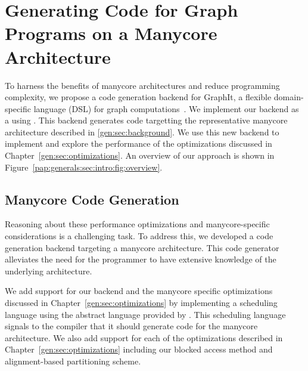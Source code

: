 \chapter{Generating Code for Graph Programs on a Manycore Architecture}\label{gen:sec:graphitbackend}
%

\introOverviewFigure

To harness the benefits of manycore architectures and reduce programming complexity, we propose a code generation backend for GraphIt, a flexible domain-specific language (DSL) for graph computations~\cite{zhang2018graphit}. 
We implement our backend as a \graphvm using \ugc.
This backend generates code targetting the representative manycore architecture described in \ref{gen:sec:background}.
We use this new backend to implement and explore the performance of the optimizations discussed in Chapter~\ref{gen:sec:optimizations}.
An overview of our approach is shown in Figure~\ref{pap:generals:sec:intro:fig:overview}.

\section{Manycore Code Generation}\label{sec:method:sub:baseline}

Reasoning about these performance optimizations and manycore-specific considerations is a challenging task.
To address this, we developed a code generation backend targeting a manycore architecture.
This code generator alleviates the need for the programmer to have extensive knowledge of the underlying architecture.

We add support for our backend and the manycore specific optimizations discussed in Chapter~\ref{gen:sec:optimizations} by implementing a \hb scheduling language using the abstract language provided by \GG.
This scheduling language signals to the \graphit compiler that it should generate code for the \hb manycore architecture.
We also add support for each of the optimizations described in Chapter~\ref{gen:sec:optimizations} including our blocked access method and alignment-based partitioning scheme.

